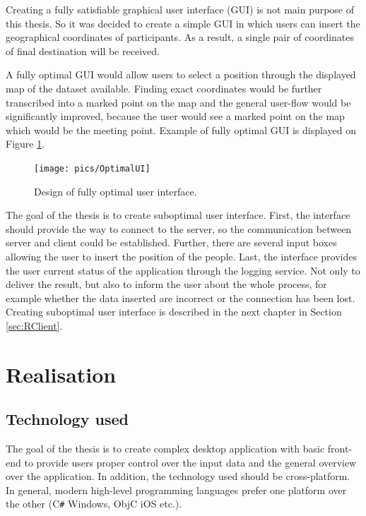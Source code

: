 \documentclass[thesis=M,english]{FITthesis}[2012/10/20]
\begin{document}
Creating a fully satisfiable graphical user interface (GUI) is not main purpose of this thesis. So it was decided to create a simple GUI in which users can insert the geographical coordinates of participants. As a result, a single pair of coordinates of final destination will be received. 

A fully optimal GUI would allow users to select a position through the displayed map of the dataset available. Finding exact coordinates would be further transcribed into a marked point on the map and the general user-flow would be significantly improved, because the user would see a marked point on the map which would be the meeting point. Example of fully optimal GUI is displayed on Figure \ref{fig:OptUI}.


\begin{figure}[H]
\centering
\texttt{[image: pics/OptimalUI]}
\caption{Design of fully optimal user interface.}
\label{fig:OptUI}
\end{figure}

The goal of the thesis is to create suboptimal user interface. First, the interface should provide the way to connect to the server, so the communication between server and client could be established. Further, there are several input boxes allowing the user to insert the position of the people. Last, the interface provides the user current status of the application through the logging service. Not only to deliver the result, but also to inform the user about the whole process, for example whether the data inserted are incorrect or the connection has been lost.
Creating suboptimal user interface is described in the next chapter in Section \ref{sec:RClient}.

\chapter{Realisation}
\label{ch:Realisation}

\section{Technology used}
\label{sec:TechUsed}
The goal of the thesis is to create complex desktop application with basic front-end to provide users proper control over the input data and the general overview over the application. In addition, the technology used should be cross-platform. In general, modern high-level programming languages prefer one platform over the other (C\texttt{\#} Windows, ObjC iOS etc.). 
\end{document}
